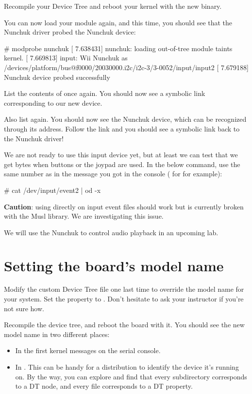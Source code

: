 Recompile your Device Tree and reboot your kernel with the new binary.

You can now load your module again, and this time, you should see that
the Nunchuk driver probed the Nunchuk device:

\begin{bashinput}
# modprobe nunchuk
[    7.638431] nunchuk: loading out-of-tree module taints kernel.
[    7.669813] input: Wii Nunchuk as /devices/platform/bus@f0000/20030000.i2c/i2c-3/3-0052/input/input2
[    7.679188] Nunchuk device probed successfully
\end{bashinput}

List the contents of  once again. You
should now see a symbolic link corresponding to our new device.

Also list  again. You should now see the
Nunchuk device, which can be recognized through its  address.
Follow the link and you should see a symbolic link back to the Nunchuk
driver!

We are not ready to use this input device yet, but at least we can test
that we get bytes when buttons or the joypad are used. In the below
command, use the same number as in the message you got in the console
( for  for example):

\begin{bashinput}
# cat /dev/input/event2 | od -x
\end{bashinput}

{\bf Caution}: using  directly on input event files should
work but is currently broken with the Musl library. We are investigating
this issue.

We will use the Nunchuk to control audio playback in an upcoming lab.

\section{Setting the board's model name}

Modify the custom Device Tree file one last time to override the model
name for your system. Set the  property to
. Don't hesitate to ask your
instructor if you're not sure how.

Recompile the device tree, and reboot the board with it. You should see
the new model name in two different places:

\begin{itemize}
\item In the first kernel messages on the serial console.
\item In . This can be
      handy for a distribution to identify the device it's running on.
      By the way, you can explore  and
      find that every subdirectory corresponds to a DT node, and every
      file corresponds to a DT property.
\end{itemize}

